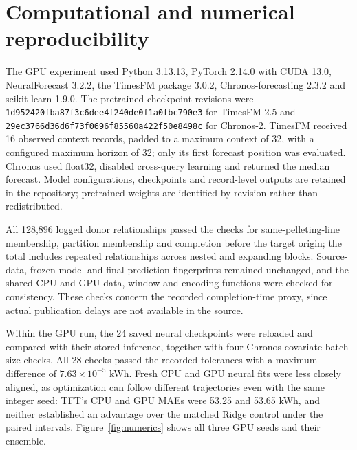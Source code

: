 \appendix
\section{Computational and numerical reproducibility}\label{sec:computing}
The GPU experiment used Python 3.13.13, PyTorch 2.14.0 with CUDA 13.0, NeuralForecast 3.2.2, the TimesFM package 3.0.2, Chronos-forecasting 2.3.2 and scikit-learn 1.9.0. The pretrained checkpoint revisions were \texttt{1d952420fba87f3c6dee4f240de0f1a0fbc790e3} for TimesFM 2.5 and \texttt{29ec3766d36d6f73f0696f85560a422f50e8498c} for Chronos-2. TimesFM received 16 observed context records, padded to a maximum context of 32, with a configured maximum horizon of 32; only its first forecast position was evaluated. Chronos used float32, disabled cross-query learning and returned the median forecast. Model configurations, checkpoints and record-level outputs are retained in the repository; pretrained weights are identified by revision rather than redistributed.

All 128,896 logged donor relationships passed the checks for same-pelleting-line membership, partition membership and completion before the target origin; the total includes repeated relationships across nested and expanding blocks. Source-data, frozen-model and final-prediction fingerprints remained unchanged, and the shared CPU and GPU data, window and encoding functions were checked for consistency. These checks concern the recorded completion-time proxy, since actual publication delays are not available in the source.


Within the GPU run, the 24 saved neural checkpoints were reloaded and compared with their stored inference, together with four Chronos covariate batch-size checks. All 28 checks passed the recorded tolerances with a maximum difference of $7.63\times10^{-5}$ kWh. Fresh CPU and GPU neural fits were less closely aligned, as optimization can follow different trajectories even with the same integer seed: TFT's CPU and GPU MAEs were 53.25 and 53.65 kWh, and neither established an advantage over the matched Ridge control under the paired intervals. Figure~\ref{fig:numerics} shows all three GPU seeds and their ensemble.

